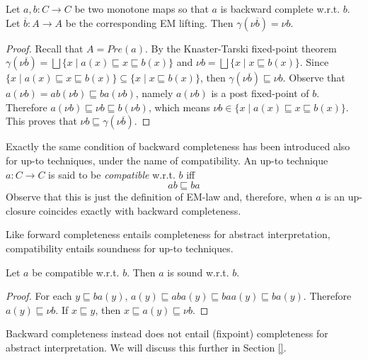\documentclass[smallcondensed,envcountsect,envcountsame]{svjour3}     %
\begin{document}
\begin{proposition}
Let $a,b\colon C\to C$ be two monotone maps so that $a$ is backward complete w.r.t. $b$. Let $\overline{b}\colon A \to A$ be the corresponding EM lifting. Then $\gamma(\nu {\overline{b}}) = \nu b$.
\end{proposition}
\begin{proof}
Recall that $A = Pre(a)$. By the Knaster-Tarski fixed-point theorem  $\gamma(\nu {\overline{b}}) =  \bigsqcup \{ x  \mid a(x) \sqsubseteq x \sqsubseteq b(x) \}$ and  $\nu b = \bigsqcup \{ x  \mid x \sqsubseteq b(x) \}$. Since $\{ x  \mid a(x) \sqsubseteq x \sqsubseteq b(x) \} \subseteq \{ x  \mid x \sqsubseteq b(x) \}$, then $\gamma(\nu {\overline{b}}) \sqsubseteq \nu b$.
Observe that $a(\nu b) = ab(\nu b)\sqsubseteq ba(\nu b)$, namely $a(\nu b)$ is a post fixed-point of $b$. Therefore $a(\nu b) \sqsubseteq \nu b \sqsubseteq b(\nu b)$, which means $\nu b \in \{ x  \mid a(x) \sqsubseteq x \sqsubseteq b(x) \}$. This proves that $\nu b \sqsubseteq \gamma(\nu {\overline{b}})$.
\end{proof}


%

Exactly the same condition of backward completeness has been introduced also for up-to techniques, under the name of compatibility. An up-to technique $a\colon C\to C$ is said to be \emph{compatible} w.r.t. $b$ iff 
$$ab \sqsubseteq ba$$ 
Observe that this is just the definition of EM-law and, therefore, when $a$ is an up-closure coincides exactly with backward completeness.

Like forward completeness entails completeness for abstract interpretation, compatibility entails soundness for up-to techniques.

\begin{proposition}\label{prop:compatible}
Let $a$ be compatible w.r.t. $b$. Then $a$ is sound w.r.t. $b$.
\end{proposition}
\begin{proof} 
For each $y\sqsubseteq ba(y)$, $a(y)\sqsubseteq aba(y) \sqsubseteq baa(y) \sqsubseteq ba(y)$. Therefore $a(y)\sqsubseteq \nu b$. If $x\sqsubseteq y$, then $x\sqsubseteq a(y)\sqsubseteq \nu b$.
\end{proof}
Backward completeness instead does not entail (fixpoint) completeness for abstract interpretation. We will discuss this further in Section \ref{}.
\end{document}

